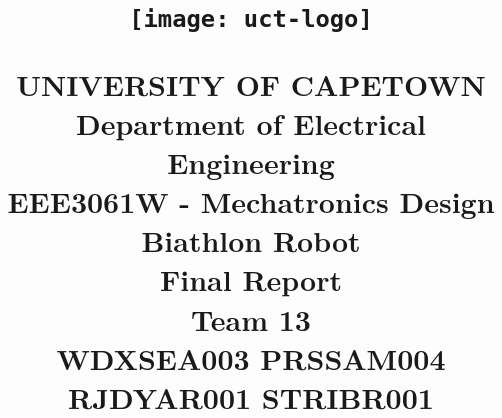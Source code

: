 
\newcommand{\reportTitle}{Final Report} %
\newcommand{\reportDueDate}{Wednesday,\ September\ 03,\ 2014}                    %
\newcommand{\reportClass}{EEE3061W - Mechatronics Design}                               %
\newcommand{\reportClassTime}{10:30am}                                 %
\newcommand{\reportClassInstructor}{Jones}                               %
\newcommand{\reportAuthorName}{Team 13}                           %
\newcommand{\reportDepartment}{Department of Electrical Engineering}           %


\title{
\begin{figure}[H]
  \begin{center}
    \texttt{[image: uct-logo]}
  \end{center}
\end{figure}
\textmd{\Huge UNIVERSITY OF CAPETOWN \\ \LARGE \reportDepartment} \\
\vspace{2in}
\textmd{\textbf{\LARGE \reportClass \\ \Huge Biathlon Robot \\ \reportTitle \\ \vspace{1.5in} \Large Team 13 \\  WDXSEA003 \textbar\space PRSSAM004 \textbar\space RJDYAR001 \textbar\space STRIBR001}}\\
}

\date{}



  \maketitle
  \thispagestyle{empty}

